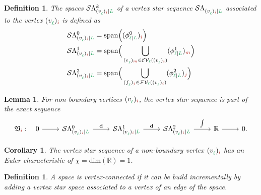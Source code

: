 \documentclass[12pt, a4paper]{article}
\newcommand{\green}{\color{ForestGreen}}
\newcommand{\brickred}{\color{BrickRed}}
\newcommand{\V}{\mathcal{V}}
\newcommand{\E}{\mathcal{E}}
\newcommand{\F}{\mathcal{F}}
\newcommand{\vertex}[2]{\freeQ{v}{}{#1}{#2}}
\newcommand{\edge}[2]{\freeQ{e}{}{#1}{#2}}
\newcommand{\face}[2]{\freeQ{f}{}{#1}{#2}}
\newcommand{\EVl}[1]{\E\V_{#1}}
\newcommand{\FVl}[1]{\F\V_{#1}}
\newcommand{\coarseIdxone}{{\brickred i}}
\newcommand{\coarseIdxtwo}{{\brickred m}}
\newcommand{\fineIdxone}{{\brickred j}}
\renewcommand{\l}{{\green\ell}}
\renewcommand{\L}{{\green L}}
\newcommand{\constrQ}[5]{({#1}^{#2}_{#3 \vert #4})_{#5}}
\newcommand{\freeQ}[4]{({#1}^{#2}_{#3})_{#4}}
\newcommand{\extd}{\mathbf{d}}
\newcommand{\SDFspace}[3]{\mathcal{S}\Lambda^{#1}_{#2 \vert #3}}
\newcommand{\SDFbasis}{\phi}
\newtheorem{definition}[theorem]{Definition}
\newtheorem{lemma}[theorem]{Lemma}
\newtheorem{corollary}[theorem]{Corollary}
\numberwithin{equation}{section}
\begin{document}
\begin{definition}
    The spaces $\SDFspace{k}{\vertex{\l}{\coarseIdxone}}{\L}$ of a vertex star sequence $\SDFspace{\dotfill}{\vertex{\l}{\coarseIdxone}}{\L}$ associated to the vertex $\vertex{\l}{\coarseIdxone}$ is defined as
    \begin{equation}
    \begin{aligned}
        \SDFspace{0}{\vertex{\l}{\coarseIdxone}}{\L} &= \mathrm{span} \Big( \constrQ{\SDFbasis}{0}{\l}{\L}{\coarseIdxone} \Big) \\
        \SDFspace{1}{\vertex{\l}{\coarseIdxone}}{\L} &= \mathrm{span} \Big( \bigcup\limits_{\edge{\l}{\coarseIdxtwo} \in \EVl{\l} (\vertex{\l}{\coarseIdxone})} \constrQ{\SDFbasis}{1}{\l}{\L}{\coarseIdxtwo} \Big) \\
        \SDFspace{2}{\vertex{\l}{\coarseIdxone}}{\L} &= \mathrm{span} \Big( \bigcup\limits_{\face{\l}{\fineIdxone} \in \FVl{\l} (\vertex{\l}{\coarseIdxone})} \constrQ{\SDFbasis}{2}{\l}{\L}{\fineIdxone} \Big)
    \end{aligned}
    \end{equation}
\end{definition}

\begin{lemma}
    For non-boundary vertices $\vertex{\l}{\coarseIdxone}$, the vertex star sequence is part of the exact sequence
    \begin{equation}
    \begin{tikzcd}
        \mathfrak{V}_\coarseIdxone: \quad 0 \arrow[r] & \SDFspace{0}{\vertex{\l}{\coarseIdxone}}{\L} \arrow[r, "\extd"] & \SDFspace{1}{\vertex{\l}{\coarseIdxone}}{\L} \arrow[r, "\extd"] & \SDFspace{2}{\vertex{\l}{\coarseIdxone}}{\L} \arrow[r, "\int"] & \mathbb{R} \arrow[r] & 0.
    \end{tikzcd}
    \end{equation}
\end{lemma}

\begin{corollary}
    The vertex star sequence of a non-boundary vertex $\vertex{\l}{\coarseIdxone}$ has an Euler characteristic of $\chi = \mathrm{dim}(\mathbb{R}) = 1$.
\end{corollary}

\begin{definition}
    A space is vertex-connected if it can be build incrementally by adding a vertex star space associated to a vertex of an edge of the space.
\end{definition}
\end{document}
